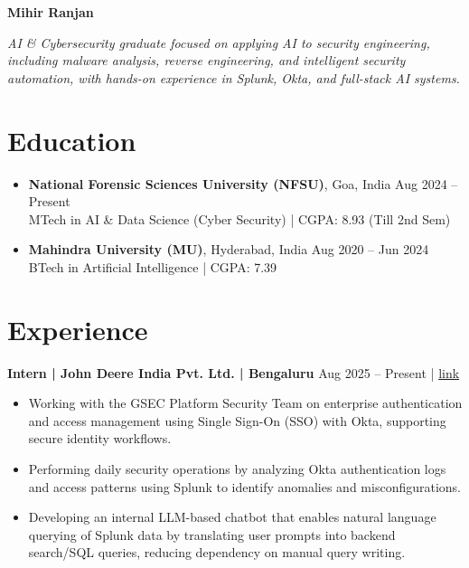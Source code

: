 \documentclass[a4paper,10pt]{article}
\begin{document}

\begin{center}
    {\Huge\textbf{Mihir Ranjan}}
\end{center}

\begin{center}
\normalsize
{}
\end{center}

\vspace{1mm}
\textit{AI \& Cybersecurity graduate focused on applying AI to security engineering, including malware analysis, reverse engineering, and intelligent security automation, with hands-on experience in  Splunk, Okta, and full-stack AI systems.}



\section{\textbf{Education}}
\begin{itemize}[leftmargin=*]
\item \textbf{National Forensic Sciences University (NFSU)}, Goa, India \hfill Aug 2024 -- Present \\
MTech in AI \& Data Science (Cyber Security) | CGPA: 8.93 (Till 2nd Sem)

\item \textbf{Mahindra University (MU)}, Hyderabad, India \hfill Aug 2020 -- Jun 2024 \\
BTech in Artificial Intelligence | CGPA: 7.39
\end{itemize}


\section{\textbf{Experience}}

\textbf{Intern | John Deere India Pvt. Ltd. | Bengaluru} \hfill Aug 2025 -- Present |
\href{https://drive.google.com/file/d/1NGKccMNJ6PCJyySXnh-hhefYy7hMsqMX/view?usp=sharing}{link}
\begin{itemize}[leftmargin=*]
\item Working with the GSEC Platform Security Team on enterprise authentication and access management using Single Sign-On (SSO) with Okta, supporting secure identity workflows.
\item Performing daily security operations by analyzing Okta authentication logs and access patterns using Splunk to identify anomalies and misconfigurations.
\item Developing an internal LLM-based chatbot that enables natural language querying of Splunk data by translating user prompts into backend search/SQL queries, reducing dependency on manual query writing.
\end{itemize}
\end{document}
